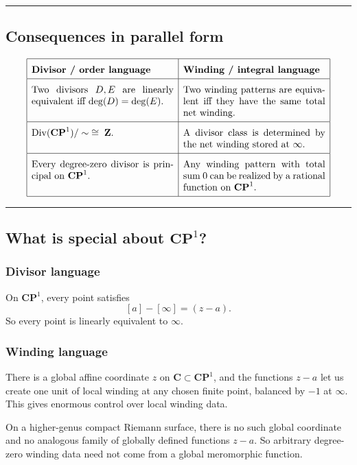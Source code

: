 \documentclass[11pt]{article}
\newcommand{\Div}{\operatorname{Div}}
\begin{document}
	\bigskip
	\hrule
	\bigskip
	
	\subsection*{Consequences in parallel form}
	
	\[
	\renewcommand{\arraystretch}{1.7}
	\begin{array}{|p{0.43\textwidth}|p{0.43\textwidth}|}
		\hline
		\textbf{Divisor / order language} & \textbf{Winding / integral language} \\
		\hline
		Two divisors \(D,E\) are linearly equivalent iff \(\deg(D)=\deg(E)\). &
		Two winding patterns are equivalent iff they have the same total net winding. \\
		\hline
		\(\Div(\mathbf{CP}^1)/\sim \;\cong\; \mathbf{Z}\). &
		A divisor class is determined by the net winding stored at \(\infty\). \\
		\hline
		Every degree-zero divisor is principal on \(\mathbf{CP}^1\). &
		Any winding pattern with total sum \(0\) can be realized by a rational function on \(\mathbf{CP}^1\). \\
		\hline
	\end{array}
	\]
	
	\bigskip
	\hrule
	\bigskip
	
	\subsection*{What is special about \texorpdfstring{$\mathbf{CP}^1$}{CP1}?}
	
	\subsubsection*{Divisor language}
	On \(\mathbf{CP}^1\), every point satisfies
	\[
	[a]-[\infty]=(z-a).
	\]
	So every point is linearly equivalent to \(\infty\).
	
	\subsubsection*{Winding language}
	There is a global affine coordinate \(z\) on \(\mathbf{C}\subset \mathbf{CP}^1\), and the functions \(z-a\) let us create one unit of local winding at any chosen finite point, balanced by \(-1\) at \(\infty\). This gives enormous control over local winding data.
	
	On a higher-genus compact Riemann surface, there is no such global coordinate and no analogous family of globally defined functions \(z-a\). So arbitrary degree-zero winding data need not come from a global meromorphic function.
	
\end{document}
